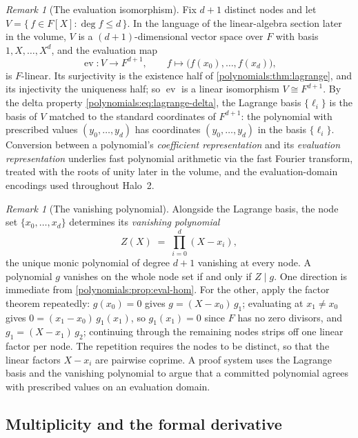 \documentclass[11pt,a4paper]{article}
\theoremstyle{definition}
\theoremstyle{remark}
\newtheorem{remark}[theorem]{Remark}
\begin{document}
\begin{remark}[The evaluation isomorphism]\label{polynomials:rem:eval-iso}
Fix \(d+1\) distinct nodes and let
\(V = \{\, f \in F[X] : \deg f \le d \,\}\). In the language of the
linear-algebra section later in the volume, \(V\) is a
\((d+1)\)-dimensional vector space over \(F\) with basis
\(1, X, \dots, X^d\), and the evaluation map
\[
\operatorname{ev}\colon V \to F^{d+1},
\qquad
f \longmapsto \bigl(f(x_0), \dots, f(x_d)\bigr),
\]
is \(F\)-linear. Its surjectivity is the existence half of
\cref{polynomials:thm:lagrange}, and its injectivity the uniqueness half;
so \(\operatorname{ev}\) is a linear isomorphism \(V \cong F^{d+1}\). By
the delta property \eqref{polynomials:eq:lagrange-delta}, the Lagrange
basis \(\{\ell_i\}\) is the basis of \(V\) matched to the standard
coordinates of \(F^{d+1}\): the
polynomial with prescribed values \((y_0,\dots,y_d)\) has coordinates
\((y_0,\dots,y_d)\) in the basis \(\{\ell_i\}\). Conversion between a
polynomial's \emph{coefficient representation} and its
\emph{evaluation representation} underlies fast polynomial arithmetic
via the fast Fourier transform, treated with the roots of unity later in
the volume, and the evaluation-domain encodings used throughout Halo~2.
\end{remark}

\begin{remark}[The vanishing polynomial]\label{polynomials:rem:vanishing}
Alongside the Lagrange basis, the node set \(\{x_0,\dots,x_d\}\)
determines its \emph{vanishing polynomial}
\[
Z(X) \;=\; \prod_{i=0}^{d} (X - x_i),
\]
the unique monic polynomial of degree \(d+1\) vanishing at every node.
A polynomial \(g\) vanishes on the whole node set if and only if
\(Z \mid g\). One direction is immediate from
\cref{polynomials:prop:eval-hom}. For the other, apply the factor
theorem repeatedly: \(g(x_0) = 0\) gives \(g = (X - x_0)\, g_1\);
evaluating at \(x_1 \neq x_0\) gives
\(0 = (x_1 - x_0)\, g_1(x_1)\), so \(g_1(x_1) = 0\) since \(F\) has no
zero divisors, and \(g_1 = (X - x_1)\, g_2\); continuing through the
remaining nodes strips off one linear factor per node. The repetition
requires the nodes to be distinct, so that the linear factors
\(X - x_i\) are pairwise coprime. A proof system uses the Lagrange basis
and the vanishing polynomial to argue that a committed polynomial agrees
with prescribed values on an evaluation domain.
\end{remark}

\subsection{Multiplicity and the formal derivative}
\label{polynomials:sub:derivative}
\end{document}
